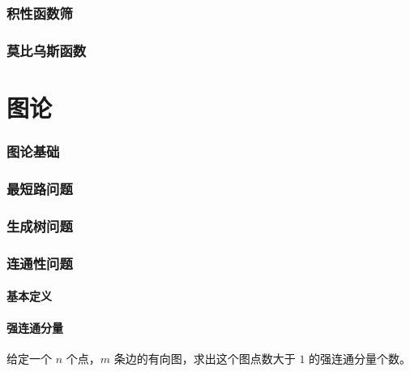 \documentclass[12pt,a4paper]{article}
\begin{document}
\section{积性函数筛}

\newpage
\section{莫比乌斯函数}

\newpage
\part{图论} %
\section{图论基础}

\newpage
\section{最短路问题} %

\newpage
\section{生成树问题} %

\newpage
\section{连通性问题}
\subsection{基本定义}
\subsection{强连通分量}
\begin{mdframed}[leftline=true, linewidth=2pt, linecolor=gray]
	 给定一个 $n$ 个点，$m$ 条边的有向图，求出这个图点数大于 $1$ 的强连通分量个数。
\end{mdframed}
\end{document}
